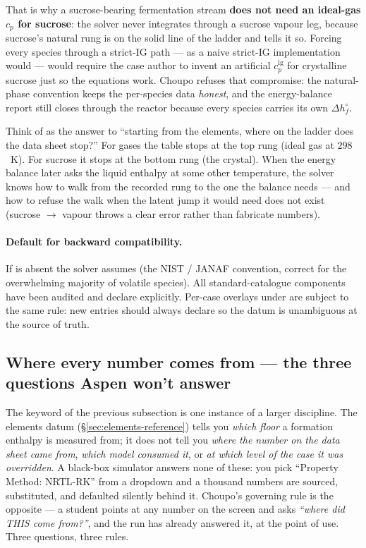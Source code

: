 \documentclass[11pt,a4paper]{article}
\begin{document}
That is why a sucrose-bearing fermentation stream
\textbf{does not need an ideal-gas $c_p$ for sucrose}: the solver
never integrates through a sucrose vapour leg, because sucrose's
natural rung is on the solid line of the ladder and 
tells it so.  Forcing every species through a strict-IG path --- as a
naive strict-IG implementation would --- would require the case
author to invent an artificial $c_p^{\mathrm{ig}}$ for crystalline
sucrose just so the equations work.  Choupo refuses that compromise:
the natural-phase convention keeps the per-species data \emph{honest},
and the energy-balance report still closes through the reactor because
every species carries its own $\Delta h^{\circ}_f$.

\begin{intuition}
Think of  as the answer to ``starting from the elements,
where on the ladder does the data sheet stop?''  For gases the table
stops at the top rung (ideal gas at $298$~K).  For sucrose it stops at
the bottom rung (the crystal).  When the energy balance later asks the
liquid enthalpy at some other temperature, the solver knows how to
walk from the recorded rung to the one the balance needs --- and how
to refuse the walk when the latent jump it would need does not exist
(sucrose $\to$ vapour throws a clear error rather than fabricate
numbers).
\end{intuition}

\paragraph{Default for backward compatibility.}
If  is absent the solver assumes  (the
NIST / JANAF convention, correct for the overwhelming majority of
volatile species).  All standard-catalogue components have been
audited and declare  explicitly.  Per-case overlays under
 are subject to the same
rule: new entries should always declare  so the datum is
unambiguous at the source of truth.

\subsection{Where every number comes from --- the three questions
            Aspen won't answer}
\label{sec:data-provenance-questions}

The  keyword of the previous subsection is one instance of a
larger discipline.  The elements datum (\S\ref{sec:elements-reference})
tells you \emph{which floor} a formation enthalpy is measured from; it
does not tell you \emph{where the number on the data sheet came from},
\emph{which model consumed it}, or \emph{at which level of the case it
was overridden}.  A black-box simulator answers none of these: you pick
``Property Method: NRTL-RK'' from a dropdown and a thousand numbers are
sourced, substituted, and defaulted silently behind it.  Choupo's
governing rule is the opposite --- a student points at any number on the
screen and asks \emph{``where did THIS come from?''}, and the run has
already answered it, at the point of use.  Three questions, three rules.
\end{document}
